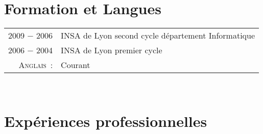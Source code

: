 \documentclass[a4paper,10pt]{article}
\begin{document}
  \section{Formation et Langues}
  \begin{tabular}{rl}
    2009 − 2006         & INSA de Lyon second cycle département Informatique \\
    2006 − 2004         & INSA de Lyon premier cycle \\
    \textsc{Anglais :}  & Courant \\
  \end{tabular} \\

  \section{Expériences professionnelles}
\end{document}

